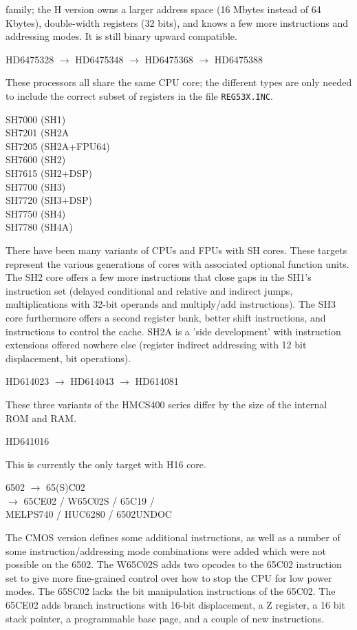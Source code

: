\documentclass[12pt,twoside]{report}
\newcommand{\tty}[1]{{\tt #1}}
\begin{document}
family; the H version owns a larger address space (16 Mbytes instead
of 64 Kbytes), double-width registers (32 bits), and knows a few more
instructions and addressing modes.  It is still binary upward
compatible.
\begin{cpulist}
   HD6475328 $\rightarrow$ HD6475348 $\rightarrow$ HD6475368 $\rightarrow$ HD6475388
\end{cpulist}
These processors all share the same CPU core; the different types are
only needed to include the correct subset of registers in the file
\tty{REG53X.INC}.
\begin{cpulist}
   SH7000 (SH1) \\
   SH7201 (SH2A \\
   SH7205 (SH2A+FPU64) \\
   SH7600 (SH2) \\
   SH7615 (SH2+DSP) \\
   SH7700 (SH3) \\
   SH7720 (SH3+DSP) \\
   SH7750 (SH4) \\
   SH7780 (SH4A) \\
\end{cpulist}
There have been many variants of CPUs and FPUs with SH cores.  These
targets represent the various generations of cores with associated
optional function units.  The SH2 core offers a few more instructions that
close gaps in the SH1's instruction set (delayed conditional and
relative and indirect jumps, multiplications with 32-bit operands and
multiply/add instructions).  The SH3 core furthermore offers a second
register bank, better shift instructions, and instructions to control
the cache.  SH2A is a 'side development' with instruction extensions
offered nowhere else (register indirect addressing with 12 bit displacement,
bit operations).
\begin{cpulist}
   HD614023 $\longrightarrow$ HD614043 $\longrightarrow$ HD614081
\end{cpulist}
These three variants of the HMCS400 series differ by the size of
the internal ROM and RAM.
\begin{cpulist}
   HD641016
\end{cpulist}
This is currently the only target with H16 core.
\begin{cpulist}
   6502 $\rightarrow$ 65(S)C02 \\
\> $\rightarrow$ 65CE02 / W65C02S / 65C19 /\\
\> MELPS740 / HUC6280 / 6502UNDOC
\end{cpulist}
The CMOS version defines some additional instructions, as well as a number of
some instruction/addressing mode combinations were added which were not
possible on the 6502.  The W65C02S adds two opcodes to the 65C02 instruction
set to give more fine-grained control over how to stop the CPU for low power
modes.  The 65SC02 lacks the bit manipulation instructions of the
65C02.  The 65CE02 adds branch instructions with 16-bit displacement, a Z
register, a 16 bit stack pointer, a programmable base page, and a couple of
new instructions.
\end{document}
